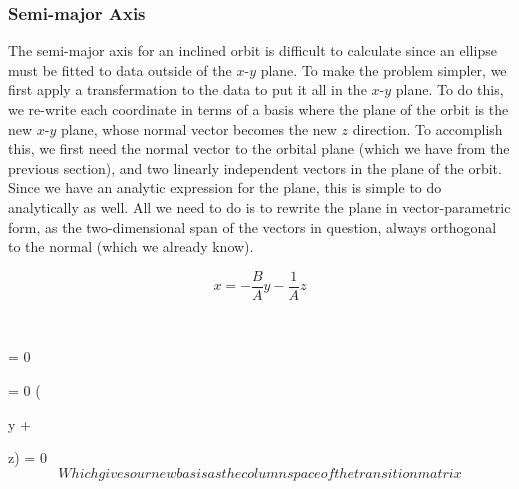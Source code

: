 \documentclass[a4paper,12pt]{article} %
\numberwithin{equation}{section} %
\numberwithin{figure}{section} %
\begin{document}
\subsubsection{Semi-major Axis}

The semi-major axis for an inclined orbit is difficult to calculate since an ellipse must be fitted to data outside of the $x$-$y$ plane. To make the problem simpler, we first apply a transfermation to the data to put it all in the $x$-$y$ plane. To do this, we re-write each coordinate in terms of a basis where the plane of the orbit is the new $x$-$y$ plane, whose normal vector becomes the new $z$ direction. To accomplish this, we first need the normal vector to the orbital plane (which we have from the previous section), and two linearly independent vectors in the plane of the orbit. Since we have an analytic expression for the plane, this is simple to do analytically as well. All we need to do is to rewrite the plane in vector-parametric form, as the two-dimensional span of the vectors in question, always orthogonal to the normal (which we already know).

$$x = -\frac{B}{A}y - \frac{1}{A}z$$

$$\begin{bmatrix}
   x \\
   y  \\
   z}
 \end{bmatrix} \cdot {}  = 0 \implies \begin{bmatrix}
    -y - z \\
    y  \\
    z}
  \end{bmatrix} \cdot {} = 0 \implies \left(\begin{bmatrix}
     - \\
     1  \\
     0}
   \end{bmatrix}y +  \begin{bmatrix}
      - \\
      0  \\
      1}
    \end{bmatrix}z\right)\cdot {} = 0 $$

Which gives our new basis as the column space of the transition matrix $$\begin{bmatrix}
   - & -} & A \\
   1 & 0 & B  \\
   0 & 1 & 1}
 \end{bmatrix}$$
\end{document}
